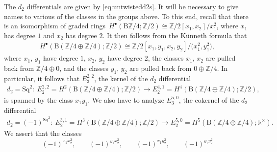 \documentclass[10pt,a4paper]{amsart}
\numberwithin{equation}{section}
\begin{document}
The $d_2$ differentials are given by \eqref{eq:untwistedd2s}. It will be necessary to give names to various of the classes in the groups above. To this end, recall that there is an isomorphism of graded rings~$H^{\bullet}(\mathrm{B}\mathbb{Z}/4;\mathbb{Z}/2)\cong \mathbb{Z}/2[x_1,x_2]/x_1^2$, where $x_1$ has degree $1$ and $x_2$ has degree $2$. It then follows from the K\"unneth formula that
\begin{gather*}
H^{\bullet}(\mathrm{B}(\mathbb{Z}/4\oplus\mathbb{Z}/4);\mathbb{Z}/2)\cong \mathbb{Z}/2[x_1,y_1,x_2,y_2]/\big(x_1^2,y_1^2\big),
\end{gather*}
 where $x_1$, $y_1$ have degree $1$, $x_2$, $y_2$ have degree $2$, the classes $x_1$, $x_2$ are pulled back from $\mathbb{Z}/4\oplus 0$, and the classes $y_1$, $y_2$ are pulled back from $0\oplus \mathbb{Z}/4$. In particular, it follows that $E_3^{2,2}$, the kernel of the $d_2$ differential
 \begin{gather*}
 d_2=\mathrm{Sq}^2\colon\ E^{2,2}_2=H^2(\mathrm{B}(\mathbb{Z}/4\oplus\mathbb{Z}/4);\mathbb{Z}/2)\rightarrow E^{4,1}_2=H^4(\mathrm{B}(\mathbb{Z}/4\oplus\mathbb{Z}/4);\mathbb{Z}/2),
 \end{gather*}
 is spanned by the class $x_1y_1$. We also have to analyze $E_3^{5,0}$, the cokernel of the $d_2$ differential
 \begin{gather*}
 d_2=(-1)^{\mathrm{Sq}^2}\colon\ E^{3,1}_2=H^3(\mathrm{B}(\mathbb{Z}/4\oplus\mathbb{Z}/4);\mathbb{Z}/2)\rightarrow E^{5,0}_2=H^5(\mathrm{B}(\mathbb{Z}/4\oplus\mathbb{Z}/4);\mathds{k}^{\times}).
 \end{gather*}
 We assert that the classes
 \begin{equation}\label{eqn:2torsionclasses}
 (-1)^{x_1x_2^2},\qquad (-1)^{y_1x_2^2},\qquad (-1)^{x_1y_2^2},\qquad (-1)^{y_1y_2^2}
 \end{equation}
\end{document}

